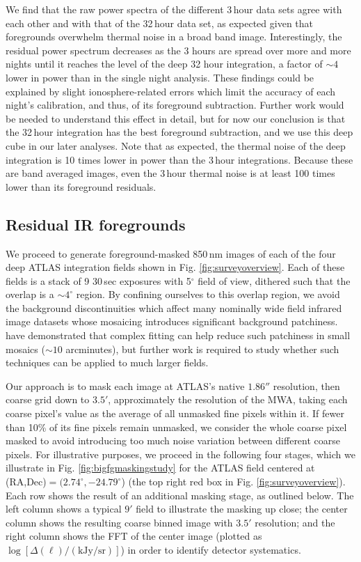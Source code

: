 \documentclass[numberedappendix]{emulateapj}
\begin{document}
We find that the raw power spectra of the different 3\,hour data sets agree with each other and with that of the 32\,hour data set, as expected given that foregrounds overwhelm thermal noise in a broad band image. Interestingly, the residual power spectrum decreases as the 3 hours are spread over more and more nights until it reaches the level of the deep 32 hour integration, a factor of $\sim4$ lower in power than in the single night analysis. These findings could be explained by slight ionosphere-related errors which limit the accuracy of each night's calibration, and thus, of its foreground subtraction. Further work would be needed to understand this effect in detail, but for now our conclusion is that the 32\,hour integration has the best foreground subtraction, and we use this deep cube in our later analyses. Note that as expected, the thermal noise of the deep integration is 10 times lower in power than the 3\,hour integrations. Because these are band averaged images, even the 3\,hour thermal noise is at least 100 times lower than its foreground residuals.

\subsection{Residual IR foregrounds}
\label{sec:resirfg}

We proceed to generate foreground-masked 850\,nm images of each of the four deep ATLAS integration fields shown in Fig. \ref{fig:surveyoverview}. Each of these fields is a stack of 9 30\,sec exposures with 5$^\circ$ field of view, dithered such that the overlap is a $\sim4^\circ$ region. By confining ourselves to this overlap region, we avoid the background discontinuities which affect many nominally wide field infrared image datasets whose mosaicing introduces significant background patchiness. \citet{mw15} have demonstrated that complex fitting \citep{fixen00} can help reduce such patchiness in small mosaics ($\sim10$ arcminutes), but further work is required to study whether such techniques can be applied to much larger fields.

Our approach is to mask each image at ATLAS's native $1.86''$ resolution, then coarse grid down to $3.5'$, approximately the resolution of the MWA, taking each coarse pixel's value as the average of all unmasked fine pixels within it. If fewer than 10\% of its fine pixels remain unmasked, we consider the whole coarse pixel masked to avoid introducing too much noise variation between different coarse pixels. For illustrative purposes, we proceed in the following four stages, which we illustrate in Fig. \ref{fig:bigfgmaskingstudy} for the ATLAS field centered at (RA,Dec)$=(2.74^\circ, -24.79^\circ$) (the top right red box in Fig. \ref{fig:surveyoverview}). Each row shows the result of an additional masking stage, as outlined below. The left column shows a typical $9'$ field to illustrate the masking up close; the center column shows the resulting coarse binned image with $3.5'$ resolution; and the right column shows the FFT of the center image (plotted as $\log[\Delta(\ell)/(\text{kJy/sr})]$) in order to identify detector systematics. 
\end{document}
